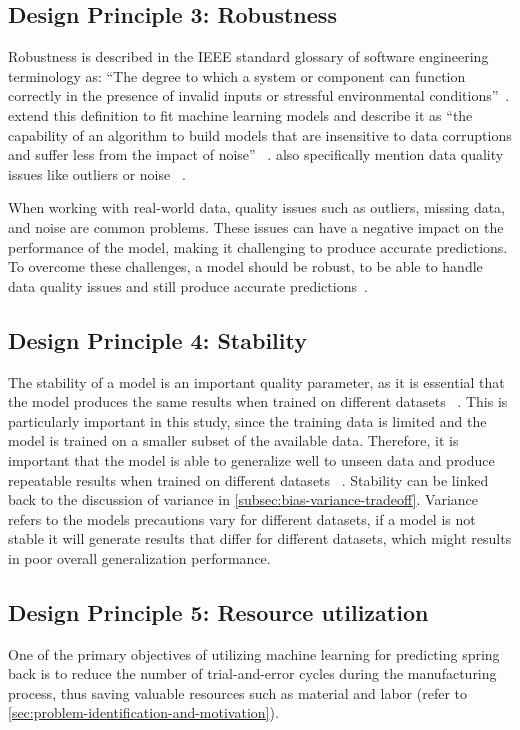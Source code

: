 {\subsection*{Design Principle 3: Robustness}
Robustness is described in the IEEE standard glossary of software engineering terminology as:
``The degree to which a system or component can function correctly in the presence of
invalid inputs or stressful environmental conditions''~\cite[p. 64]{terminology1990ieee}.
\cite{saez2016evaluating} extend this definition to fit machine learning
models and describe it as ``the capability of an algorithm to build models that are insensitive to
data corruptions and suffer less from the impact of noise''
~\cite[p. 2]{saez_evaluatingclassifierbehavior_2016}.
\cite{siebert2022construction} also specifically mention data quality issues like
outliers or noise
~\cite[p. 16]{siebert2022construction}.

When working with real-world data, quality issues such as outliers, missing data, and
noise are common problems.
These issues can have a negative impact on the performance of the model, making it challenging to produce accurate
predictions.
To overcome these challenges, a model should be robust, to be able to handle data quality issues and still produce
accurate predictions~\cite[p. 16]{siebert2022construction}.

\subsection*{Design Principle 4: Stability}

The stability of a model is an important quality parameter, as it is essential that
the model produces the same results when trained on different datasets
~\cite[p. 16]{siebert2022construction}.
This is particularly important in this study, since the training data is limited and the model is trained on a
smaller subset of the available data.
Therefore, it is important that the model is able to generalize well to unseen data and
produce repeatable results when trained on different datasets
~\cite[p. 16]{siebert2022construction}.
Stability can be linked back to the discussion of variance in \cref{subsec:bias-variance-tradeoff}.
Variance refers to the models precautions vary for different datasets, if a model is not stable it will generate
results that differ for different datasets, which might results in poor overall generalization performance.


\subsection*{Design Principle 5: Resource utilization}\label{subsec:dp5-resource-utilization}
One of the primary objectives of utilizing machine learning for predicting spring back is to
reduce the number of trial-and-error cycles during the manufacturing process, thus saving
valuable resources such as material and labor
(refer to \cref{sec:problem-identification-and-motivation}).

}
